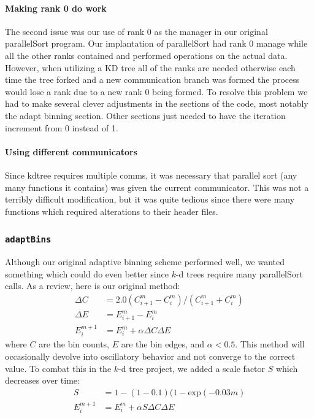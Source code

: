 \documentclass{article}
\begin{document}
\paragraph{Making rank 0 do work}
The second issue was our use of rank 0 as the manager in our original parallelSort program. Our implantation of parallelSort had rank 0 manage while all the other ranks contained and performed operations on the actual data. However, when utilizing a KD tree all of the ranks are needed otherwise each time the tree forked and a new communication branch was formed the process would lose a rank due to a new rank 0 being formed. To resolve this problem  we had to make several clever adjustments in the sections of the code, most notably the adapt binning section. Other sections just needed to have the iteration increment from 0 instead of 1. 
\paragraph{Using different communicators}
Since kdtree requires multiple comms, it was necessary that parallel sort (any many functions it contains) was given the current communicator. This was not a terribly difficult modification, but it was quite tedious since there were many functions which required alterations to their header files.


\subsubsection{\texttt{adaptBins}}
Although our original adaptive binning scheme performed well, we wanted something which could do even better since $k$-d trees require many parallelSort calls. As a review, here is our original method:
\begin{equation}
	\begin{split}
		\Delta C & = 2.0 ( C^{m}_{i+1} - C^{m}_i ) / ( C^{m}_{i+1} + C^{m}_i ) \\
		\Delta E & = E^m_{i+1} - E^m_i \\
		E^{m+1}_i & = E^m_i + \alpha \Delta C \Delta E
	\end{split}
\end{equation}
where $C$ are the bin counts, $E$ are the bin edges, and $\alpha < 0.5$. This method will occasionally devolve into oscillatory behavior and not converge to the correct value. To combat this in the $k$-d tree project, we added a scale factor $S$ which decreases over time:
\begin{equation}
	\begin{split}
		S & = 1 - (1 - 0.1) (1 - \textrm{exp}(-0.03 m) \\
		E^{m+1}_i & = E^m_i + \alpha S \Delta C \Delta E
	\end{split}
\end{equation}
\end{document}
